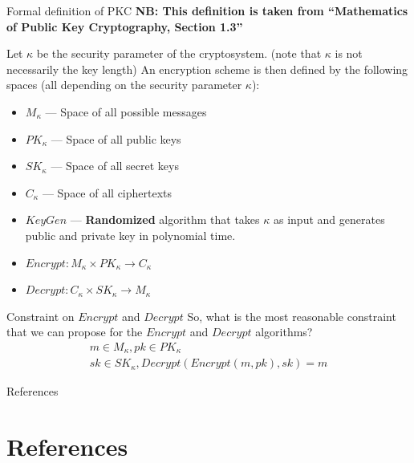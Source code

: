 \documentclass{beamer}
\begin{document}
\begin{frame}{Formal definition of PKC}
    \textbf{NB: This definition is taken from ``Mathematics of Public Key Cryptography, Section 1.3''} 
    \begin{definition}
        Let $\kappa$ be the security parameter of the cryptosystem. (note that 
        $\kappa$ is not necessarily the key length) An encryption scheme is then 
        defined by the following spaces (all depending on the security parameter 
        $\kappa$):
        \begin{itemize}
            \item $M_\kappa$ --- Space of all possible messages
            \item $PK_\kappa$ --- Space of all public keys
            \item $SK_\kappa$ --- Space of all secret keys
            \item $C_\kappa$ --- Space of all ciphertexts
            \item $KeyGen$ --- \textbf{Randomized} algorithm that takes $\kappa$ as input and generates
            public and private key in polynomial time. 
            \item $Encrypt : M_\kappa \times PK_\kappa \to C_\kappa$ 
            \item $Decrypt : C_\kappa \times SK_\kappa \to M_\kappa$
        \end{itemize}
    \end{definition}
\end{frame}

\begin{frame}{Constraint on $Encrypt$ and $Decrypt$}
    So, what is the most reasonable constraint that we can propose for the 
    $Encrypt$ and $Decrypt$ algorithms?
    \pause
    \begin{eqnarray*}
        m \in M_\kappa, pk \in PK_\kappa \\ 
        sk \in SK_\kappa, Decrypt(Encrypt(m, pk), sk) = m
    \end{eqnarray*}
\end{frame}

\begin{frame}{References}
	\section*{References}
    \fontsize{6}{7.2}\selectfont
	
	
\end{frame}
\end{document}
